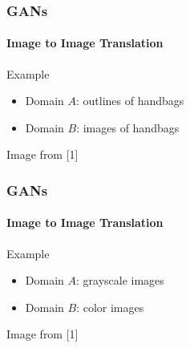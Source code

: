 \documentclass[xetex,professionalfont]{beamer}
\begin{document}
\begin{frame}
	\frametitle{GANs}
	\framesubtitle{Image to Image Translation}

	Example
	\begin{itemize}
		\item Domain $A$: outlines of handbags
		\item Domain $B$: images of handbags
	\end{itemize}

	\medskip

	\begin{center}
		{\centering Image from [1]}
	\end{center}

\end{frame}


\begin{frame}
	\frametitle{GANs}
	\framesubtitle{Image to Image Translation}

	Example
	\begin{itemize}
		\item Domain $A$: grayscale images
		\item Domain $B$: color images
	\end{itemize}

	\medskip

	\begin{center}
		{\centering Image from [1]}
	\end{center}

\end{frame}
\end{document}
